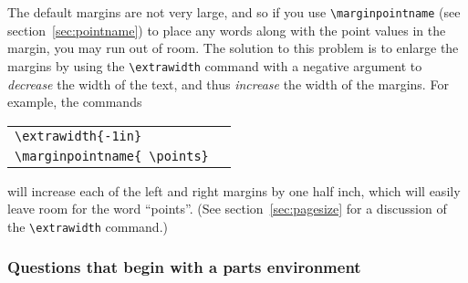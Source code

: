 \documentclass[12pt]{exam}
\begin{document}
The default margins are not very large, and so if you use
\verb"\marginpointname" (see section~\ref{sec:pointname}) to place any
words along with the point values in the margin, you may run out of
room.  The solution to this problem is to enlarge the margins by using
the \verb"\extrawidth" command with a negative argument to
\emph{decrease} the width of the text, and thus \emph{increase} the
width of the margins.  For example, the commands
\begin{center}
  \begin{tabular}{ll}
    \verb"\extrawidth{-1in}"\\
    \verb"\marginpointname{ \points}"
  \end{tabular}
\end{center}
will increase each of the left and right margins by one half inch,
which will easily leave room for the word ``points''.  (See
section~\ref{sec:pagesize} for a discussion of the \verb"\extrawidth"
command.)
\subsubsection{Questions that begin with a parts environment}
\end{document}
